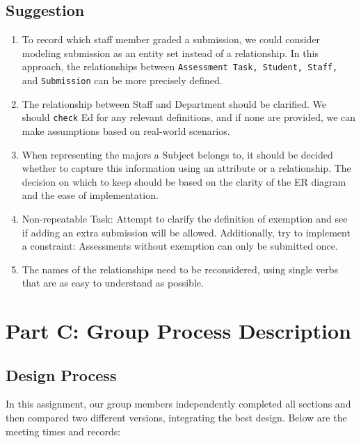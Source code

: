 \documentclass[a4paper,12pt]{article}
\begin{document}
\subsection*{Suggestion}
    \begin{enumerate}
        \item To record which staff member graded a submission, we could consider modeling submission as an entity set instead of a relationship. In this approach, the relationships between \texttt{Assessment Task, Student, Staff,} and \texttt{Submission} can be more precisely defined.
        
        \item The relationship between Staff and Department should be clarified. We should \texttt{check} Ed for any relevant definitions, and if none are provided, we can make assumptions based on real-world scenarios.

        \item When representing the majors a Subject belongs to, it should be decided whether to capture this information using an attribute or a relationship. The decision on which to keep should be based on the clarity of the ER diagram and the ease of implementation.

        \item Non-repeatable Task: Attempt to clarify the definition of exemption and see if adding an extra submission will be allowed. Additionally, try to implement a constraint: Assessments without exemption can only be submitted once.

        \item The names of the relationships need to be reconsidered, using single verbs that are as easy to understand as possible.

    \end{enumerate}

\newpage

\section*{Part C: Group Process Description}
\hypertarget{PartC}{}
\noindent
\subsection*{Design Process}
In this assignment, our group members independently completed all sections and then compared two different versions, integrating the best design. Below are the meeting times and records:
\end{document}
